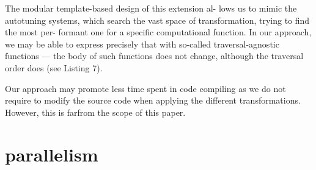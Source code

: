 The modular template-based design of this extension al-
lows us to mimic the autotuning systems, which search the
vast space of transformation, trying to find the most per-
formant one for a specific computational function. In our
approach, we may be able to express precisely that with
so-called traversal-agnostic functions — the body of such
functions does not change, although the traversal order does
(see Listing 7).

Our approach may promote less time spent in code compiling as we do not require to modify the source code when applying the different transformations. However, this is farfrom the scope of this paper.



\section{parallelism}





